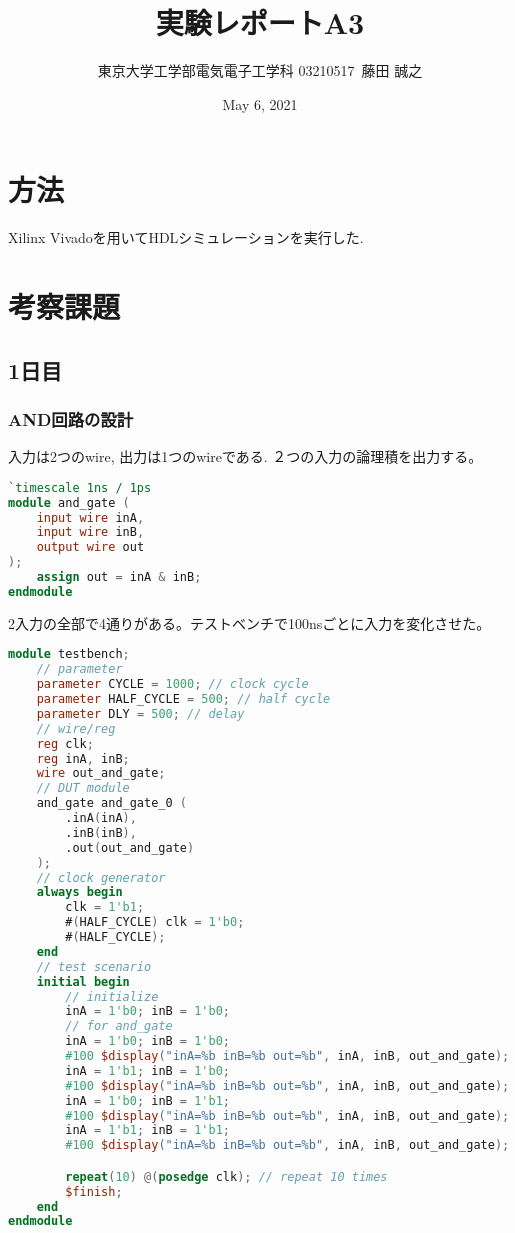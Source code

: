 \documentclass{ltjsarticle}
\title{実験レポートA3}
\author{東京大学工学部電気電子工学科 03210517\ 藤田 誠之 }
\date{May 6, 2021}
\begin{document}
\maketitle
\section{方法}
Xilinx Vivadoを用いてHDLシミュレーションを実行した.
\section{考察課題}
\subsection{1日目}
\subsubsection{AND回路の設計}

入力は2つのwire, 出力は1つのwireである. ２つの入力の論理積を出力する。
\begin{lstlisting}[caption=AND回路デザイン,language=verilog]
`timescale 1ns / 1ps
module and_gate (
    input wire inA,
    input wire inB,
    output wire out
);
    assign out = inA & inB;
endmodule
\end{lstlisting}
2入力の全部で4通りがある。テストベンチで100nsごとに入力を変化させた。
\begin{lstlisting}[caption=AND回路テストベンチ,language=verilog]
    module testbench;
    // parameter
    parameter CYCLE = 1000; // clock cycle
    parameter HALF_CYCLE = 500; // half cycle
    parameter DLY = 500; // delay
    // wire/reg
    reg clk;
    reg inA, inB;
    wire out_and_gate;
    // DUT module
    and_gate and_gate_0 (
        .inA(inA),
        .inB(inB),
        .out(out_and_gate)
    );
    // clock generator
    always begin
        clk = 1'b1;
        #(HALF_CYCLE) clk = 1'b0;
        #(HALF_CYCLE);
    end
    // test scenario
    initial begin
        // initialize
        inA = 1'b0; inB = 1'b0; 
        // for and_gate
        inA = 1'b0; inB = 1'b0;
        #100 $display("inA=%b inB=%b out=%b", inA, inB, out_and_gate);
        inA = 1'b1; inB = 1'b0;
        #100 $display("inA=%b inB=%b out=%b", inA, inB, out_and_gate);  
        inA = 1'b0; inB = 1'b1;
        #100 $display("inA=%b inB=%b out=%b", inA, inB, out_and_gate);  
        inA = 1'b1; inB = 1'b1;
        #100 $display("inA=%b inB=%b out=%b", inA, inB, out_and_gate);

        repeat(10) @(posedge clk); // repeat 10 times
        $finish;
    end
endmodule
\end{lstlisting}
\end{document}
